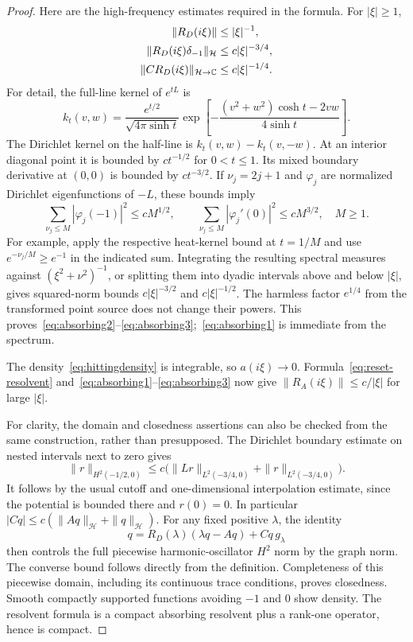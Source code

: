 \documentclass[11pt,a4paper]{article}
\numberwithin{equation}{section}
\theoremstyle{remark}\newtheorem{remark}[theorem]{Remark}
\newcommand{\HH}{\mathcal H}\newcommand{\DD}{\mathcal D}
\begin{document}
\begin{proof}
Here are the high-frequency estimates required in the formula. For $|\xi|\geq1$,
\begin{align}
 \|R_D(i\xi)\|&\leq |\xi|^{-1},\label{eq:absorbing1}\\
 \|R_D(i\xi)\delta_{-1}\|_\HH&\leq c|\xi|^{-3/4},\label{eq:absorbing2}\\
 \|CR_D(i\xi)\|_{\HH\to\C}&\leq c|\xi|^{-1/4}.\label{eq:absorbing3}
\end{align}
For detail, the full-line kernel of $e^{tL}$ is
\[
 k_t(v,w)=\frac{e^{t/2}}{\sqrt{4\pi\sinh t}}
 \exp\left[-\frac{(v^2+w^2)\cosh t-2vw}{4\sinh t}\right].
\]
The Dirichlet kernel on the half-line is $k_t(v,w)-k_t(v,-w)$. At an interior diagonal point it is bounded by $ct^{-1/2}$ for $0<t\leq1$. Its mixed boundary derivative at $(0,0)$ is bounded by $ct^{-3/2}$. If $\nu_j=2j+1$ and $\varphi_j$ are normalized Dirichlet eigenfunctions of $-L$, these bounds imply
\[
 \sum_{\nu_j\leq M}|\varphi_j(-1)|^2\leq cM^{1/2},\qquad
 \sum_{\nu_j\leq M}|\varphi_j'(0)|^2\leq cM^{3/2},\quad M\geq1.
\]
For example, apply the respective heat-kernel bound at $t=1/M$ and use $e^{-\nu_j/M}\geq e^{-1}$ in the indicated sum. Integrating the resulting spectral measures against $(\xi^2+\nu^2)^{-1}$, or splitting them into dyadic intervals above and below $|\xi|$, gives squared-norm bounds $c|\xi|^{-3/2}$ and $c|\xi|^{-1/2}$. The harmless factor $e^{1/4}$ from the transformed point source does not change their powers. This proves~\eqref{eq:absorbing2}--\eqref{eq:absorbing3};~\eqref{eq:absorbing1} is immediate from the spectrum.

The density~\eqref{eq:hittingdensity} is integrable, so $a(i\xi)\to0$. Formula~\eqref{eq:reset-resolvent} and~\eqref{eq:absorbing1}--\eqref{eq:absorbing3} now give $\|R_A(i\xi)\|\leq c/|\xi|$ for large $|\xi|$.

For clarity, the domain and closedness assertions can also be checked from the same construction, rather than presupposed. The Dirichlet boundary estimate on nested intervals next to zero gives
\[
 \|r\|_{H^2(-1/2,0)}\leq c\bigl(\|Lr\|_{L^2(-3/4,0)}
                                  +\|r\|_{L^2(-3/4,0)}\bigr).
\]
It follows by the usual cutoff and one-dimensional interpolation estimate, since the potential is bounded there and $r(0)=0$. In particular $|Cq|\leq c(\|Aq\|_\HH+\|q\|_\HH)$. For any fixed positive $\lambda$, the identity
\[
 q=R_D(\lambda)(\lambda q-Aq)+Cq\,g_\lambda
\]
then controls the full piecewise harmonic-oscillator $H^2$ norm by the graph norm. The converse bound follows directly from the definition. Completeness of this piecewise domain, including its continuous trace conditions, proves closedness. Smooth compactly supported functions avoiding $-1$ and $0$ show density. The resolvent formula is a compact absorbing resolvent plus a rank-one operator, hence is compact.


\end{proof}
\end{document}

